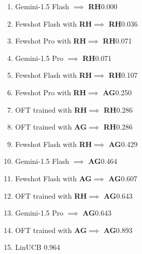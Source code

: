 \documentclass[11pt, logo]{googledeepmind}
\newcommand{\RH}{\textbf{RH}\xspace}
\newcommand{\AG}{\textbf{AG}\xspace}
\newcommand{\OFT}{OFT\xspace}
\theoremstyle{plain}
\theoremstyle{definition}
\begin{document}
\begin{enumerate}
    \item Gemini-1.5 Flash $\implies$ \RH \hfill 0.000
    \item Fewshot Flash with \RH $\implies$ \RH \hfill 0.036
    \item Fewshot Pro with \RH $\implies$ \RH \hfill 0.071
    \item Gemini-1.5 Pro $\implies$ \RH \hfill 0.071
    \item Fewshot Flash with \RH $\implies$ \RH \hfill 0.107
    \item Fewshot Pro with \RH $\implies$ \AG \hfill 0.250
    \item \OFT trained with \RH $\implies$ \RH \hfill 0.286
    \item \OFT trained with \AG $\implies$ \RH \hfill 0.286
    \item Fewshot Flash with \RH $\implies$ \AG \hfill 0.429
    \item Gemini-1.5 Flash $\implies$ \AG \hfill 0.464
    \item Fewshot Flash with \AG $\implies$ \AG \hfill 0.607
    \item \OFT trained with \RH $\implies$ \AG \hfill 0.643
    \item Gemini-1.5 Pro $\implies$ \AG \hfill  0.643
    \item \OFT trained with \AG $\implies$ \AG \hfill  0.893
    \item LinUCB \hfill 0.964
\end{enumerate}
\end{document}
